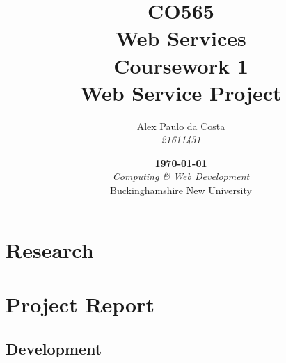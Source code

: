 \documentclass{report}
\title{
        \fontspec[Path=.fonts/]{LibertineDisplay.ttf}
        \Large CO565\\
        Web Services\\
        Coursework 1\vspace*{.65cm}\\
        \huge Web Service Project\vfill
    }
\author{
        Alex Paulo da Costa\\
        \textit{21611431}\\
    }
\date{
        \vfill\textbf{\today}\\
        \vspace*{.75cm}\textit{Computing \& Web Development}\\
        Buckinghamshire New University
    }
\begin{document}
    
        \maketitle
        \tableofcontents

        \part{Research}
        
        
        
        
        \part{Project Report}
        
        
        
        \chapter{Development}
        
        
        
        
    
\end{document}
